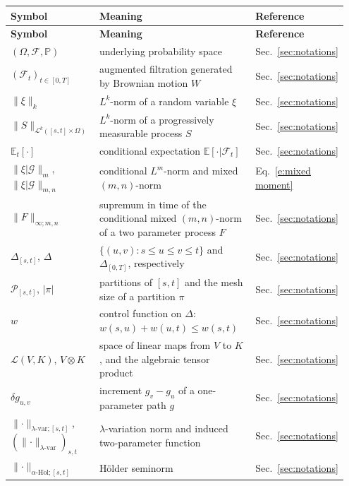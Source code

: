 \documentclass[11pt,reqno]{amsart}
\numberwithin{equation}{section}
\def\E{\mathbb E}
\begin{document}
\renewcommand{\arraystretch}{1.2}
\setlength{\tabcolsep}{6pt}
\begin{longtable}{@{}p{0.24\linewidth} p{0.56\linewidth} p{0.15\linewidth}@{}}
\textbf{Symbol} & \textbf{Meaning} & \textbf{Reference} \\
\hline
\endfirsthead
\textbf{Symbol} & \textbf{Meaning} & \textbf{Reference} \\
\hline
\endhead

$(\Omega,\mathcal F,\mathbb P)$ & underlying probability space & Sec.~\ref{sec:notations} \\
$(\mathcal F_t)_{t\in[0,T]}$ & augmented filtration generated by Brownian motion $W$ & Sec.~\ref{sec:notations} \\
$\|\xi\|_k$ & $L^k$-norm of a random variable $\xi$ & Sec.~\ref{sec:notations} \\
$\|S\|_{\mathcal L^{k}([s,t] \times \Omega)}$ & $L^k$-norm of a progressively measurable process $S$ & Sec.~\ref{sec:notations} \\
$\E_t[\bm \cdot]$ & conditional expectation $\E[\bm \cdot | \mathcal F_t]$ & Sec.~\ref{sec:notations} \\
$\|\xi|\mathcal G\|_m$, $\|\xi|\mathcal G\|_{m,n}$ & conditional $L^m$-norm and mixed $(m,n)$-norm & Eq.~\ref{e:mixed moment} \\
$\|F\|_{\infty;m,n}$ & supremum in time of the conditional mixed $(m,n)$-norm of a two parameter process $F$& Sec.~\ref{sec:notations} \\
$\Delta_{[s,t]}$, $\Delta$ & $\{(u,v):s\leq u\leq v\leq t\}$ and $\Delta_{[0,T]}$, respectively & Sec.~\ref{sec:notations} \\
$\mathcal P_{[s,t]}$, $|\pi|$ & partitions of $[s,t]$ and the mesh size of a partition $\pi$ & Sec.~\ref{sec:notations} \\
$w$ & control function on $\Delta$: $w(s,u)+w(u,t)\leq w(s,t)$ & Sec.~\ref{sec:notations} \\
$\mathscr L(V,K)$, $V\otimes K$ & space of linear maps from $V$ to $K$, and the algebraic tensor product & Sec.~\ref{sec:notations} \\
$\delta g_{u,v}$ & increment $g_v-g_u$ of a one-parameter path $g$ & Sec.~\ref{sec:notations} \\
$\|\bm \cdot\|_{\lambda\text{-}\mathrm{var};[s,t]}$,\ $(\|\bm\cdot\|_{\lambda\text{-}\mathrm{var}})_{s,t}$ & $\lambda$-variation norm and induced two-parameter function & Sec.~\ref{sec:notations}\\
$\|\bm\cdot\|_{\alpha\text{-}\mathrm{H\ddot{o}l};[s,t]}$ & H\"older seminorm & Sec.~\ref{sec:notations} \\

\end{longtable}
\end{document}
